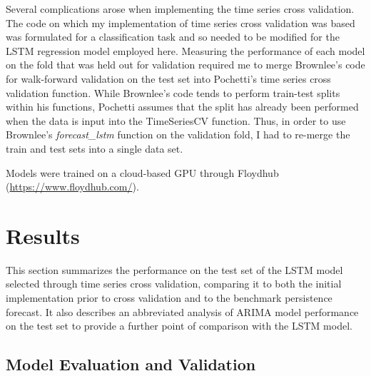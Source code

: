 \documentclass{article}
\begin{document}
Several complications arose when implementing the time series cross validation. The code on which my implementation of time series cross validation was based was formulated for a classification task and so needed to be modified for the LSTM regression model employed here. Measuring the performance of each model on the fold that was held out for validation required me to merge Brownlee's code for walk-forward validation on the test set into Pochetti's time series cross validation function. While Brownlee's code tends to perform train-test splits within his functions, Pochetti assumes that the split has already been performed when the data is input into the TimeSeriesCV function. Thus, in order to use Brownlee's \textit{forecast\_lstm} function on the validation fold, I had to re-merge the train and test sets into a single data set. 

Models were trained on a cloud-based GPU through Floydhub (\url{https://www.floydhub.com/}).









\section{Results}

This section summarizes the performance on the test set of the LSTM model selected through time series cross validation, comparing it to both the initial implementation prior to cross validation and to the benchmark persistence forecast. It also describes an abbreviated analysis of ARIMA model performance on the test set to provide a further point of comparison with the LSTM model. 

\subsection{Model Evaluation and Validation}
\end{document}
